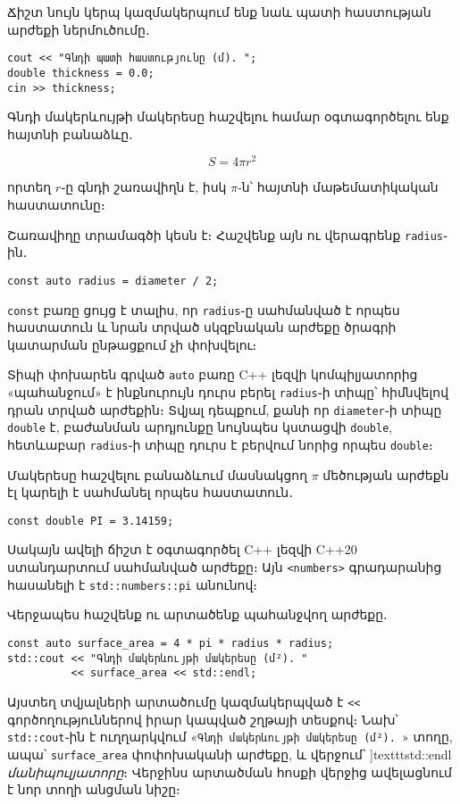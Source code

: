 Ճիշտ նույն կերպ կազմակերպում ենք նաև պատի հաստության արժեքի ներմուծումը․

\begin{Verbatim}
cout << "Գնդի պատի հաստությունը (մ). ";
double thickness = 0.0;
cin >> thickness;
\end{Verbatim}

Գնդի մակերևույթի մակերեսը հաշվելու համար օգտագործելու ենք հայտնի բանաձևը․

\[
S = 4\pi r^2
\]

\noindent որտեղ \(r\)֊ը գնդի շառավիղն է, իսկ \(\pi\)-ն՝ հայտնի 
մաթեմատիկական հաստատունը։

Շառավիղը տրամագծի կեսն է։ Հաշվենք այն ու վերագրենք \texttt{radius}֊ին․

\begin{Verbatim}
const auto radius = diameter / 2;
\end{Verbatim}

\texttt{const} բառը ցույց է տալիս, որ \texttt{radius}֊ը սահմանված է 
որպես հաստատուն և նրան տրված սկզբնական արժեքը ծրագրի կատարման ընթացքում 
չի փոխվելու։

Տիպի փոխարեն գրված \texttt{auto} բառը C++ լեզվի կոմպիլյատորից 
«պահանջում» է ինքնուրույն դուրս բերել \texttt{radius}֊ի տիպը՝ 
հիմնվելով դրան տրված արժեքին։ Տվյալ դեպքում, քանի որ 
\texttt{diameter}֊ի տիպը \texttt{double} է, բաժանման արդյունքը 
նույնպես կստացվի \texttt{double}, հետևաբար \texttt{radius}֊ի տիպը 
դուրս է բերվում նորից որպես \texttt{double}։ 

Մակերեսը հաշվելու բանաձևում մասնակցող \(\pi\) մեծության արժեքն էլ 
կարելի է սահմանել որպես հաստատուն․

\begin{Verbatim}
const double PI = 3.14159;
\end{Verbatim}

Սակայն ավելի ճիշտ է օգտագործել C++ լեզվի C++20 ստանդարտում սահմանված 
արժեքը։ Այն \texttt{<numbers>} գրադարանից հասանելի է 
\texttt{std::numbers::pi} անունով։

Վերջապես հաշվենք ու արտածենք պահանջվող արժեքը․

\begin{Verbatim}
const auto surface_area = 4 * pi * radius * radius;
std::cout << "Գնդի մակերևույթի մակերեսը (մ²). "
          << surface_area << std::endl;
\end{Verbatim}

Այստեղ տվյալների արտածումը կազմակերպված է \verb|<<| գործողություններով 
իրար կապված շղթայի տեսքով։ Նախ՝ \texttt{std::cout}֊ին է ուղղարկվում 
«\texttt{Գնդի մակերևույթի մակերեսը (մ²). }» տողը, ապա՝ 
\texttt{surface\_area} փոփոխականի արժեքը, և վերջում՝ ]texttt{std::endl}
\emph{մանիպուլյատորը}։ Վերջինս արտածման հոսքի վերջից ավելացնում է նոր 
տողի անցման նիշը։

